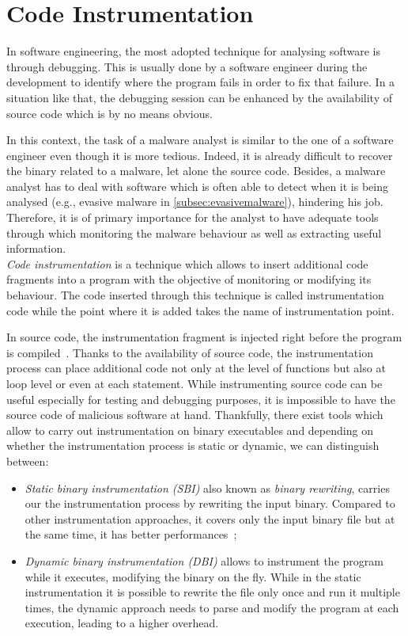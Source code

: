 \documentclass[LaM,binding=0.6cm]{sapthesis}
\begin{document}
\section{Code Instrumentation}
In software engineering, the most adopted technique for analysing software is through debugging. This is usually done by a software engineer during the development to identify where the program fails in order to fix that failure. In a situation like that, the debugging session can be enhanced by the availability of source code which is by no means obvious.

In this context, the task of a malware analyst is similar to the one of a software engineer even though it is more tedious. Indeed, it is already difficult to recover the binary related to a malware, let alone the source code. Besides, a malware analyst has to deal with software which is often able to detect when it is being analysed (e.g., evasive malware in \autoref{subsec:evasivemalware}), hindering his job. Therefore, it is of primary importance for the analyst to have adequate tools through which monitoring the malware behaviour as well as extracting useful information.\\ 

\textit{Code instrumentation} is a technique which allows to insert additional code fragments into a program with the objective of monitoring or modifying its behaviour. The code inserted through this technique is called instrumentation code while the point where it is added takes the name of instrumentation point.

In source code, the instrumentation fragment is injected right before the program is compiled~\cite{geimer2009generic}. Thanks to the availability of source code, the instrumentation process can place additional code not only at the level of functions but also at loop level or even at each statement. While instrumenting source code can be useful especially for testing and debugging purposes, it is impossible to have the source code of malicious software at hand. Thankfully, there exist tools which allow to carry out instrumentation on binary executables and depending on whether the instrumentation process is static or dynamic, we can distinguish between:
\begin{itemize}
\item \textit{Static binary instrumentation (SBI)} also known as \textit{binary rewriting}, carries our the instrumentation process by rewriting the input binary. Compared to other instrumentation approaches, it covers only the input binary file but at the same time, it has better performances~\cite{ermakov2017static};
\item \textit{Dynamic binary instrumentation (DBI)} allows to instrument the program while it executes, modifying the binary on the fly. While in the static instrumentation it is possible to rewrite the file only once and run it multiple times, the dynamic approach needs to parse and modify the program at each execution, leading to a higher overhead.
\end{itemize}
\end{document}
